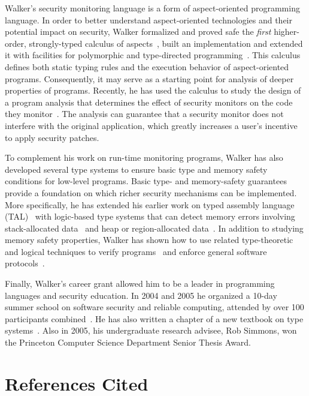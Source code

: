 \documentclass[11pt]{article}
\begin{document}
Walker's security monitoring language is a form of aspect-oriented programming language.
In order to better understand aspect-oriented technologies and their
potential impact on security, Walker formalized and proved
safe the {\em first} higher-order, strongly-typed calculus of 
aspects~\cite{walker+:aspects}, built an implementation and extended it with facilities for polymorphic
and type-directed programming~\cite{dantas+:polyaml}.  This calculus defines
both static typing rules and the execution behavior of aspect-oriented
programs.  Consequently, it may
serve as a starting point for analysis of deeper properties of programs.
Recently, he has used the calculus to study the design of a
program analysis that determines the effect of security monitors on
the code they monitor~\cite{dantas+:harmless-advice,dantas+:harmless-popl}.   The analysis
can guarantee that a security monitor does not interfere with the 
original application, which greatly increases a user's incentive
to apply security patches.

To complement his work on run-time monitoring programs, Walker has also
developed several type systems to ensure basic type and memory safety conditions
for low-level programs.  Basic type- and memory-safety guarantees provide a foundation on which
richer security mechanisms can be implemented.  More specifically, he
has extended his earlier work on typed assembly language (TAL)~\cite{morrisett+:tal,morrisett+:journal-stal} with
logic-based type systems that can detect memory errors involving
stack-allocated data~\cite{ahmed+:stack,jia+:stack} and heap or region-allocated
data~\cite{ahmed+:hierarchical-storage}.  In addition to studying memory safety
properties, Walker has shown how to use related type-theoretic and logical techniques
to verify programs~\cite{jia+:ilc} and enforce general software
protocols~\cite{mandelbaum+:refinements}.  

Finally, Walker's career grant allowed him to be a leader in
programming languages and security education. In 2004 and 2005 he organized
a 10-day summer school on software security and reliable computing,
attended by over 100 participants combined~\cite{summerschool04,summerschool05}.  He has also written a
chapter of a new textbook on type systems~\cite{walker:attapl}.  Also in 2005, his
undergraduate research advisee, Rob Simmons, won the Princeton Computer Science Department
Senior Thesis Award.



\newpage
\section{References Cited}

{

}
\end{document}
